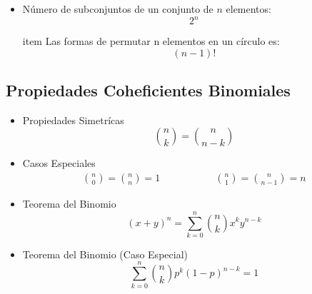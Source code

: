 \documentclass[12pt, fleqn]{report}                             %
\DeclareMathOperator \MegaSpace {\quad \quad}                   %
\theoremstyle{break}                                            %
\begin{document}
\begin{itemize}
                \item
                    Número de subconjuntos de un conjunto de $n$ elementos:
                    \begin{equation*}
                        2^n
                    \end{equation*}

                item
                    Las formas de permutar n elementos en un círculo es:
                    \begin{equation*}
                        (n - 1)!
                    \end{equation*}


            \end{itemize}


            \clearpage
            \subsection{Propiedades Coheficientes Binomiales}

                \begin{itemize}

                    \item 
                        Propiedades Simetrícas
                        \begin{equation*}
                            {n \choose k} = {n \choose n - k}
                        \end{equation*}

                    \item 
                        Casos Especiales
                        \begin{align*}
                            {n \choose 0} = {n \choose n} = 1
                            \MegaSpace \MegaSpace
                            {n \choose 1} = {n \choose n-1} = n   
                        \end{align*}

                    \item 
                        Teorema del Binomio
                        \begin{equation*}
                            (x + y)^n 
                                = \sum_{k=0}^n {n \choose k} x^k y^{n-k}
                        \end{equation*}


                    \item 
                        Teorema del Binomio (Caso Especial)
                        \begin{equation*}
                            \sum_{k=0}^n {n \choose k} p^k (1 - p)^{n-k} = 1
                        \end{equation*}

                \end{itemize}
\end{document}
